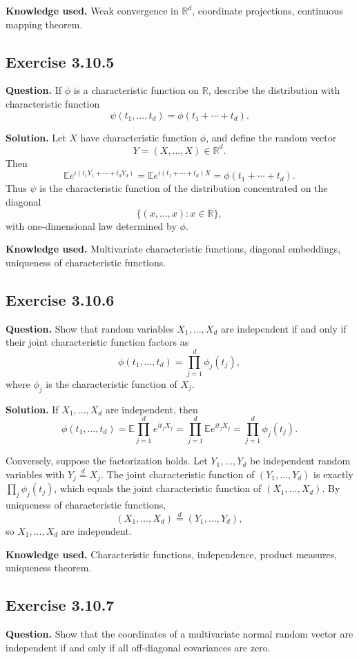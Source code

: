 \documentclass[11pt]{article}
\newcommand{\E}{\mathbb{E}}
\begin{document}
\textbf{Knowledge used.}
Weak convergence in $\mathbb R^d$, coordinate projections, continuous
mapping theorem.

\subsection*{Exercise 3.10.5}
\textbf{Question.}
If $\phi$ is a characteristic function on $\mathbb R$, describe the
distribution with characteristic function
\[
  \psi(t_1,\ldots,t_d)=\phi(t_1+\cdots+t_d).
\]

\textbf{Solution.}
Let $X$ have characteristic function $\phi$, and define the random vector
\[
  Y=(X,\ldots,X)\in\mathbb R^d.
\]
Then
\[
  \E e^{i(t_1Y_1+\cdots+t_dY_d)}
  =
  \E e^{i(t_1+\cdots+t_d)X}
  =
  \phi(t_1+\cdots+t_d).
\]
Thus $\psi$ is the characteristic function of the distribution
concentrated on the diagonal
\[
  \{(x,\ldots,x):x\in\mathbb R\},
\]
with one-dimensional law determined by $\phi$.

\textbf{Knowledge used.}
Multivariate characteristic functions, diagonal embeddings, uniqueness
of characteristic functions.

\subsection*{Exercise 3.10.6}
\textbf{Question.}
Show that random variables $X_1,\ldots,X_d$ are independent if and only
if their joint characteristic function factors as
\[
  \phi(t_1,\ldots,t_d)
  =
  \prod_{j=1}^d \phi_j(t_j),
\]
where $\phi_j$ is the characteristic function of $X_j$.

\textbf{Solution.}
If $X_1,\ldots,X_d$ are independent, then
\[
  \phi(t_1,\ldots,t_d)
  =
  \E\prod_{j=1}^d e^{it_jX_j}
  =
  \prod_{j=1}^d \E e^{it_jX_j}
  =
  \prod_{j=1}^d\phi_j(t_j).
\]

Conversely, suppose the factorization holds.  Let
$Y_1,\ldots,Y_d$ be independent random variables with
$Y_j\stackrel{d}{=}X_j$.  The joint characteristic function of
$(Y_1,\ldots,Y_d)$ is exactly $\prod_j\phi_j(t_j)$, which equals the
joint characteristic function of $(X_1,\ldots,X_d)$.  By uniqueness of
characteristic functions,
\[
  (X_1,\ldots,X_d)\stackrel{d}{=}(Y_1,\ldots,Y_d),
\]
so $X_1,\ldots,X_d$ are independent.

\textbf{Knowledge used.}
Characteristic functions, independence, product measures, uniqueness
theorem.

\subsection*{Exercise 3.10.7}
\textbf{Question.}
Show that the coordinates of a multivariate normal random vector are
independent if and only if all off-diagonal covariances are zero.
\end{document}
